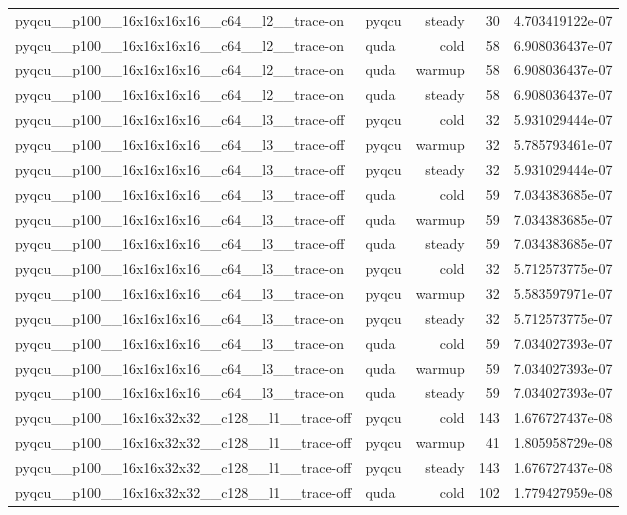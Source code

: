 \begin{table}[htbp]
\begin{tabular}{@{}llrrr@{}}
pyqcu\_\_p100\_\_16x16x16x16\_\_c64\_\_l2\_\_trace-on & pyqcu & steady & 30 & 4.703419122e-07 \\
pyqcu\_\_p100\_\_16x16x16x16\_\_c64\_\_l2\_\_trace-on & quda & cold & 58 & 6.908036437e-07 \\
pyqcu\_\_p100\_\_16x16x16x16\_\_c64\_\_l2\_\_trace-on & quda & warmup & 58 & 6.908036437e-07 \\
pyqcu\_\_p100\_\_16x16x16x16\_\_c64\_\_l2\_\_trace-on & quda & steady & 58 & 6.908036437e-07 \\
pyqcu\_\_p100\_\_16x16x16x16\_\_c64\_\_l3\_\_trace-off & pyqcu & cold & 32 & 5.931029444e-07 \\
pyqcu\_\_p100\_\_16x16x16x16\_\_c64\_\_l3\_\_trace-off & pyqcu & warmup & 32 & 5.785793461e-07 \\
pyqcu\_\_p100\_\_16x16x16x16\_\_c64\_\_l3\_\_trace-off & pyqcu & steady & 32 & 5.931029444e-07 \\
pyqcu\_\_p100\_\_16x16x16x16\_\_c64\_\_l3\_\_trace-off & quda & cold & 59 & 7.034383685e-07 \\
pyqcu\_\_p100\_\_16x16x16x16\_\_c64\_\_l3\_\_trace-off & quda & warmup & 59 & 7.034383685e-07 \\
pyqcu\_\_p100\_\_16x16x16x16\_\_c64\_\_l3\_\_trace-off & quda & steady & 59 & 7.034383685e-07 \\
pyqcu\_\_p100\_\_16x16x16x16\_\_c64\_\_l3\_\_trace-on & pyqcu & cold & 32 & 5.712573775e-07 \\
pyqcu\_\_p100\_\_16x16x16x16\_\_c64\_\_l3\_\_trace-on & pyqcu & warmup & 32 & 5.583597971e-07 \\
pyqcu\_\_p100\_\_16x16x16x16\_\_c64\_\_l3\_\_trace-on & pyqcu & steady & 32 & 5.712573775e-07 \\
pyqcu\_\_p100\_\_16x16x16x16\_\_c64\_\_l3\_\_trace-on & quda & cold & 59 & 7.034027393e-07 \\
pyqcu\_\_p100\_\_16x16x16x16\_\_c64\_\_l3\_\_trace-on & quda & warmup & 59 & 7.034027393e-07 \\
pyqcu\_\_p100\_\_16x16x16x16\_\_c64\_\_l3\_\_trace-on & quda & steady & 59 & 7.034027393e-07 \\
pyqcu\_\_p100\_\_16x16x32x32\_\_c128\_\_l1\_\_trace-off & pyqcu & cold & 143 & 1.676727437e-08 \\
pyqcu\_\_p100\_\_16x16x32x32\_\_c128\_\_l1\_\_trace-off & pyqcu & warmup & 41 & 1.805958729e-08 \\
pyqcu\_\_p100\_\_16x16x32x32\_\_c128\_\_l1\_\_trace-off & pyqcu & steady & 143 & 1.676727437e-08 \\
pyqcu\_\_p100\_\_16x16x32x32\_\_c128\_\_l1\_\_trace-off & quda & cold & 102 & 1.779427959e-08 \\

\end{tabular}
\end{table}
